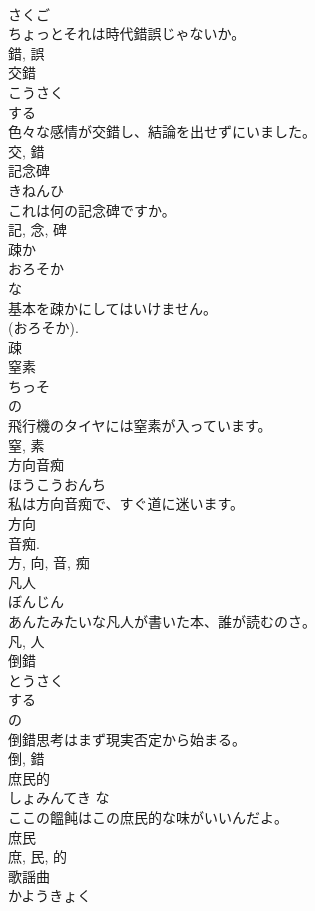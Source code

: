 \documentclass[8pt]{extreport}
\begin{document}
\begin{CJK}{UTF8}{min}
\\	さくご	
\\	ちょっとそれは時代錯誤じゃないか。	
\\	錯, 誤	
\\	交錯	
\\	こうさく	
\\	する 
\\	色々な感情が交錯し、結論を出せずにいました。	
\\	交, 錯	
\\	記念碑	
\\	きねんひ	
\\	これは何の記念碑ですか。	
\\	記, 念, 碑	
\\	疎か	
\\	おろそか	
\\	な 
\\	基本を疎かにしてはいけません。	
\\	(おろそか). 
\\	疎	
\\	窒素	
\\	ちっそ	
\\	の 
\\	飛行機のタイヤには窒素が入っています。	
\\	窒, 素	
\\	方向音痴	
\\	ほうこうおんち	
\\	私は方向音痴で、すぐ道に迷います。	
\\	方向 
\\	音痴. 
\\	方, 向, 音, 痴	
\\	凡人	
\\	ぼんじん	
\\	あんたみたいな凡人が書いた本、誰が読むのさ。	
\\	凡, 人	
\\	倒錯	
\\	とうさく	
\\	する 
\\	の 
\\	倒錯思考はまず現実否定から始まる。	
\\	倒, 錯	
\\	庶民的	
\\	しょみんてき	な 
\\	ここの饂飩はこの庶民的な味がいいんだよ。	
\\	庶民 
\\	庶, 民, 的	
\\	歌謡曲	
\\	かようきょく	

\end{CJK}
\end{document}
